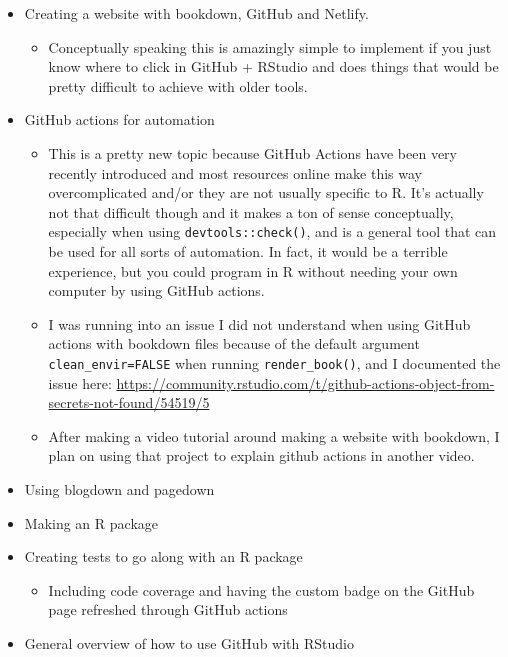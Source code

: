 \documentclass[
]{book}
\providecommand{\tightlist}{%
  \setlength{\itemsep}{0pt}\setlength{\parskip}{0pt}}
\begin{document}
\begin{itemize}
\item
  Creating a website with bookdown, GitHub and Netlify.

  \begin{itemize}
  \tightlist
  \item
    Conceptually speaking this is amazingly simple to implement if you just know where to click in GitHub + RStudio and does things that would be pretty difficult to achieve with older tools.
  \end{itemize}
\item
  GitHub actions for automation

  \begin{itemize}
  \item
    This is a pretty new topic because GitHub Actions have been very recently introduced and most resources online make this way overcomplicated and/or they are not usually specific to R. It's actually not that difficult though and it makes a ton of sense conceptually, especially when using \texttt{devtools::check()}, and is a general tool that can be used for all sorts of automation. In fact, it would be a terrible experience, but you could program in R without needing your own computer by using GitHub actions.
  \item
    I was running into an issue I did not understand when using GitHub actions with bookdown files because of the default argument \texttt{clean\_envir=FALSE} when running \texttt{render\_book()}, and I documented the issue here: \url{https://community.rstudio.com/t/github-actions-object-from-secrets-not-found/54519/5}
  \item
    After making a video tutorial around making a website with bookdown, I plan on using that project to explain github actions in another video.
  \end{itemize}
\item
  Using blogdown and pagedown
\item
  Making an R package
\item
  Creating tests to go along with an R package

  \begin{itemize}
  \tightlist
  \item
    Including code coverage and having the custom badge on the GitHub page refreshed through GitHub actions
  \end{itemize}
\item
  General overview of how to use GitHub with RStudio


\end{itemize}
\end{document}
